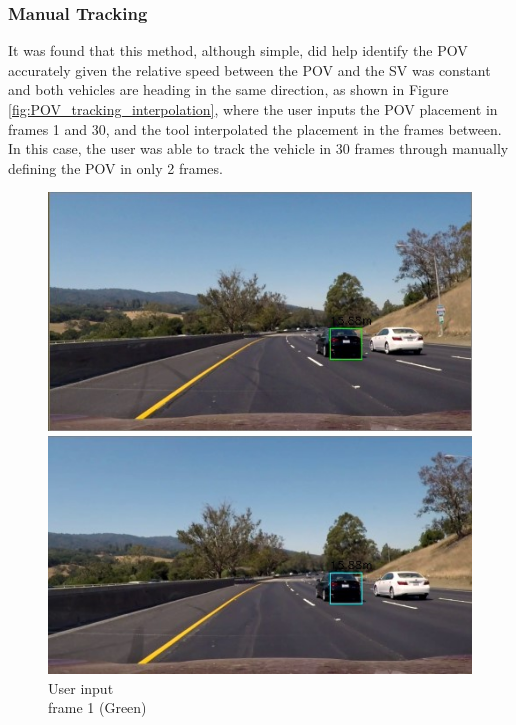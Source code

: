 \subsubsection{Manual Tracking}

It was found that this method, although simple, did help identify the POV accurately given the relative speed between the POV and the SV was constant and both vehicles are heading in the same direction, as shown in Figure \ref{fig:POV_tracking_interpolation}, where the user inputs the POV placement in frames 1 and 30, and the tool interpolated the placement in the frames between. In this case, the user was able to track the vehicle in 30 frames through manually defining the POV in only 2 frames. 

\begin{figure}[H]
\centering
\captionsetup{justification=centering}
\begin{minipage}[b]{0.45\linewidth}
    \includegraphics[width=\linewidth]{Figures/interpolation_frame_0.jpg}
    \caption*{User input\\ frame 1 (Green)}
\end{minipage}
\begin{minipage}[b]{0.45\linewidth}
    \includegraphics[width=\linewidth]{Figures/interpolation_frame_10.jpg}

\end{minipage}
\end{figure}
